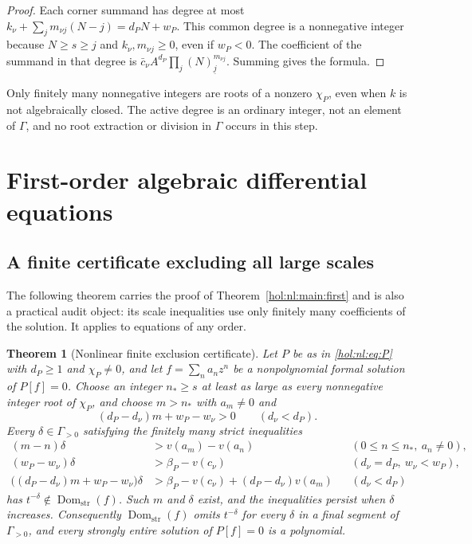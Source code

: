 \documentclass[11pt]{article}
\numberwithin{equation}{section}
\newtheorem{theorem}{Theorem}[section]
\theoremstyle{definition}
\theoremstyle{remark}
\newcommand{\Dom}{\operatorname{Dom}_{\mathrm{str}}}
\newcommand{\fall}[2]{(#1)_{\underline{#2}}}
\begin{document}
\begin{proof}
Each corner summand has degree at most
$k_\nu+\sum_jm_{\nu j}(N-j)=d_PN+w_P$. This common degree is a nonnegative
integer because $N\ge s\ge j$ and $k_\nu,m_{\nu j}\ge0$, even if $w_P<0$.
The coefficient of the summand in that degree is
$\bar c_\nu A^{d_P}\prod_j\fall Nj^{m_{\nu j}}$. Summing gives the formula.
\end{proof}

Only finitely many nonnegative integers are roots of a nonzero $\chi_P$, even
when $k$ is not algebraically closed. The active degree is an ordinary
integer, not an element of $\Gamma$, and no root extraction or division in
$\Gamma$ occurs in this step.

\section{First-order algebraic differential equations}\label{hol:nl:sec:first}

\subsection{A finite certificate excluding all large scales}

The following theorem carries the proof of Theorem~\ref{hol:nl:main:first}
and is also a practical audit object: its scale inequalities use only finitely
many coefficients of the solution. It applies to equations of any order.

\begin{theorem}[Nonlinear finite exclusion certificate]
\label{hol:nl:thm:certificate}
Let $P$ be as in \eqref{hol:nl:eq:P} with $d_P\ge1$ and $\chi_P\ne0$, and let
$f=\sum_na_nz^n$ be a nonpolynomial formal solution of $P[f]=0$. Choose an
integer $n_\ast\ge s$ at least as large as every nonnegative integer root of
$\chi_P$, and choose $m>n_\ast$ with $a_m\ne0$ and
\begin{equation}\label{hol:nl:eq:slope}
 (d_P-d_\nu)m+w_P-w_\nu>0\qquad(d_\nu<d_P).
\end{equation}
Every $\delta\in\Gamma_{>0}$ satisfying the finitely many strict inequalities
\begin{align}
 (m-n)\delta&>v(a_m)-v(a_n)
 &&(0\le n\le n_\ast,\ a_n\ne0),\label{hol:nl:eq:cert1}\\
 (w_P-w_\nu)\delta&>\beta_P-v(c_\nu)
 &&(d_\nu=d_P,\ w_\nu<w_P),\label{hol:nl:eq:cert2}\\
 \bigl((d_P-d_\nu)m+w_P-w_\nu\bigr)\delta
 &>\beta_P-v(c_\nu)+(d_P-d_\nu)v(a_m)
 &&(d_\nu<d_P)\label{hol:nl:eq:cert3}
\end{align}
has $t^{-\delta}\notin\Dom(f)$. Such $m$ and $\delta$ exist, and the
inequalities persist when $\delta$ increases. Consequently $\Dom(f)$ omits
$t^{-\delta}$ for every $\delta$ in a final segment of $\Gamma_{>0}$, and every
strongly entire solution of $P[f]=0$ is a polynomial.
\end{theorem}
\end{document}
